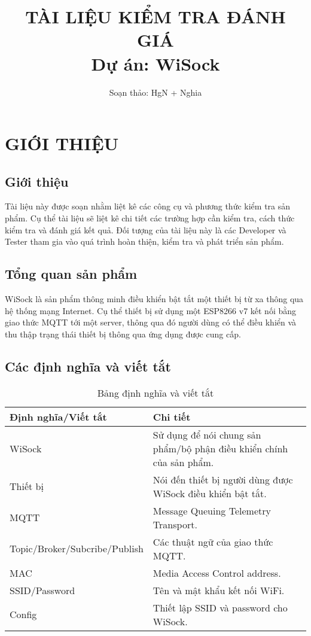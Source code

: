 \documentclass[a4paper]{article}
\title{\textbf{TÀI LIỆU KIỂM TRA ĐÁNH GIÁ\\Dự án: WiSock}}
\author{Soạn thảo: HgN + Nghia}
\let\oldsection\section
\renewcommand\section{\clearpage\oldsection}
\begin{document}
\maketitle
\tableofcontents

\section{GIỚI THIỆU}
\subsection{Giới thiệu}
Tài liệu này được soạn nhằm liệt kê các công cụ và phương thức kiểm tra sản phẩm. Cụ thể tài liệu sẽ liệt kê chi tiết các trường hợp cần kiểm tra, cách thức kiểm tra và đánh giá kết quả. Đối tượng của tài liệu này là các Developer và Tester tham gia vào quá trình hoàn thiện, kiểm tra và phát triển sản phẩm.
\subsection{Tổng quan sản phẩm}
WiSock là sản phẩm thông minh điều khiển bật tắt một thiết bị từ xa thông qua hệ thống mạng Internet. Cụ thể thiết bị sử dụng một ESP8266 v7 kết nối bằng giao thức MQTT tới một server, thông qua đó người dùng có thể điều khiển và thu thập trạng thái thiết bị thông qua ứng dụng được cung cấp.
\subsection{Các định nghĩa và viết tắt}
\begin{table}[!h]
\centering
\begin{tabular}{|l|l|}
\hline
\textbf{Định nghĩa/Viết tắt}  & \textbf{Chi tiết}                                                                                     \\ \hline
WiSock                        & Sử dụng để nói chung sản phẩm/bộ phận điều khiển chính của sản phẩm. \\ \hline
Thiết bị                      & Nói đến thiết bị người dùng được WiSock điều khiển bật tắt.                                           \\ \hline
MQTT                          & Message Queuing Telemetry Transport.                     \\ \hline
Topic/Broker/Subcribe/Publish & Các thuật ngữ của giao thức MQTT.                                                                     \\ \hline
MAC                           & Media Access Control address.                                                                         \\ \hline
SSID/Password                 & Tên và mật khẩu kết nối WiFi.                                                                         \\ \hline
Config                        & Thiết lập SSID và password cho WiSock.                                                                \\ \hline
\end{tabular}
\caption{Bảng định nghĩa và viết tắt}
\end{table}
\end{document}
